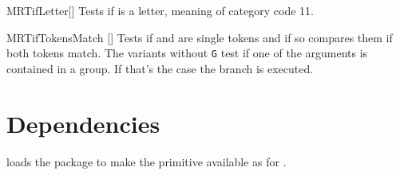 \begin{describemacroTF}[G,N,GN]{MRTifLetter}[]
  Tests if  is a letter, meaning of category code 11.
\end{describemacroTF}

\begin{describemacroTF}{MRTifTokensMatch}%
  []
  Tests if  and  are single tokens and if so compares
  them if both tokens match. The variants without \texttt{G} test if one of the
  arguments is contained in a group. If that's the case the  branch
  is executed.
\end{describemacroTF}

\section{Dependencies}
 loads the  package to make the 
primitive  available as  for .
